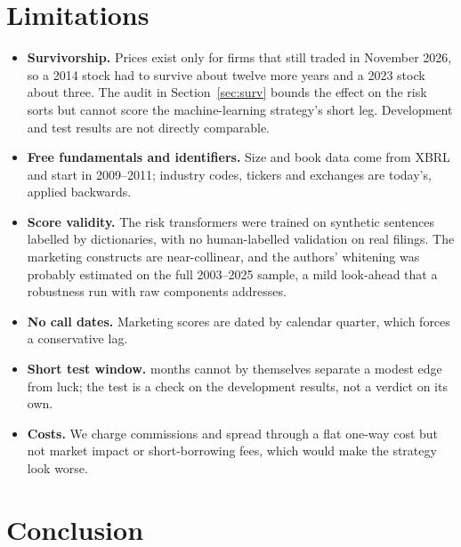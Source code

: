 \documentclass[11pt,a4paper]{article}
\begin{document}
\section{Limitations}\label{sec:limits}

\begin{itemize}
  \item \textbf{Survivorship.} Prices exist only for firms that still traded in November 2026, so a 2014 stock had to survive
  about twelve more years and a 2023 stock about three. The audit in Section~\ref{sec:surv} bounds the effect on the risk
  sorts but cannot score the machine-learning strategy's short leg. Development and test results are not directly comparable.
  \item \textbf{Free fundamentals and identifiers.} Size and book data come from XBRL and start in 2009--2011; industry codes,
  tickers and exchanges are today's, applied backwards.
  \item \textbf{Score validity.} The risk transformers were trained on synthetic sentences labelled by dictionaries, with no
  human-labelled validation on real filings. The marketing constructs are near-collinear, and the authors' whitening was
  probably estimated on the full 2003--2025 sample, a mild look-ahead that a robustness run with raw components addresses.
  \item \textbf{No call dates.} Marketing scores are dated by calendar quarter, which forces a conservative lag.
  \item \textbf{Short test window.} \TestMonths{} months cannot by themselves separate a modest edge from luck; the test is a check
  on the development results, not a verdict on its own.
  \item \textbf{Costs.} We charge commissions and spread through a flat one-way cost but not market impact or short-borrowing fees,
  which would make the strategy look worse.
\end{itemize}

\section{Conclusion}\label{sec:conclusion}
\end{document}
